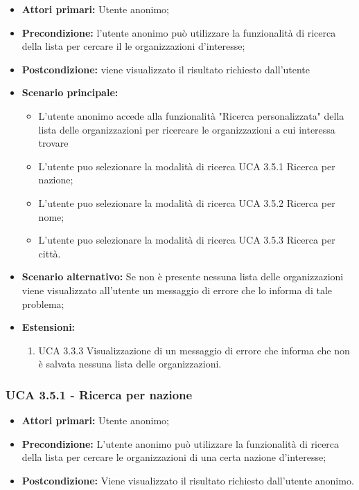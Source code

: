 \begin{itemize}
	\item \textbf{Attori primari:} Utente anonimo;
	\item \textbf{Precondizione:} l’utente anonimo può utilizzare la funzionalità di ricerca della lista per cercare il le organizzazioni d’interesse;
	\item \textbf{Postcondizione:} viene visualizzato il risultato richiesto dall’utente
	\item \textbf{Scenario principale:}
	\begin{itemize}
		\item L’utente anonimo accede alla funzionalità "Ricerca personalizzata" della lista delle organizzazioni per ricercare le organizzazioni a cui interessa trovare
		\item L'utente puo selezionare la modalità di ricerca UCA 3.5.1 Ricerca per nazione;
		\item L'utente puo selezionare la modalità di ricerca UCA 3.5.2 Ricerca per nome;
		\item L'utente puo selezionare la modalità di ricerca UCA 3.5.3 Ricerca per città.
	\end{itemize}
	\item \textbf{Scenario alternativo:} Se non è presente nessuna lista delle organizzazioni viene visualizzato all’utente un messaggio di errore che lo informa di tale problema;
	\item \textbf{Estensioni:}
	\begin{enumerate}
		\item UCA 3.3.3 Visualizzazione di un messaggio di errore che informa che non è salvata nessuna lista delle organizzazioni.
	\end{enumerate}
\end{itemize}

\subsubsection{UCA 3.5.1 - Ricerca per nazione}%
\begin{itemize}
	\item \textbf{Attori primari:} Utente anonimo;
	\item \textbf{Precondizione:} L’utente anonimo può utilizzare la funzionalità di ricerca della lista per cercare le organizzazioni di una certa nazione d’interesse;
	\item \textbf{Postcondizione:} Viene visualizzato il risultato richiesto dall’utente anonimo.
\end{itemize}

